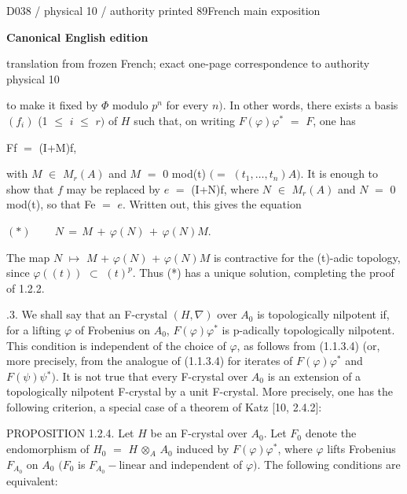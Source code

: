 \documentclass[9pt]{article}
\newcommand{\CanonText}[1]{\par{\fontsize{8.0}{9.35}\selectfont\RaggedRight #1\par}\vspace{2.2pt}}
\newcommand{\CanonDisplay}[1]{\par\vspace{1.2pt}\begin{center}{\fontsize{7.2}{8.4}\selectfont\(\displaystyle #1\)}\end{center}\vspace{1.2pt}}
\newcommand{\LayerTitle}{Canonical English edition}
\begin{document}
\noindent\begin{minipage}[t][\dimexpr\textheight-5pt\relax][t]{\textwidth}
{\sffamily\fontsize{7.3}{8.2}\selectfont\color{Quiet} D038 / physical 10 / authority printed 89\hfill French main exposition}
\par{}\vspace{4.5pt}
{\sffamily\fontsize{10.4}{11.6}\selectfont\bfseries\color{Accent} \LayerTitle}
\par{\sffamily\fontsize{6.7}{7.7}\selectfont\color{Quiet} translation from frozen French; exact one-page correspondence to authority physical 10}
\vspace{5pt}
\CanonText{to make it fixed by \(\Phi{}\) modulo \(p^{n}\) for every \(n)\). In other words, there exists a basis \((f_{i})\) (1 \(\leq{}\) \(i\) \(\leq{}\) \(r)\) of \(H\) such that, on writing \(F(\varphi{})\varphi{}^{*}\) \(=\) \(F\), one has}
\CanonText{Ff \(=\) (I+M)f,}
\CanonText{with \(M\) \(\in{}\) \(M_{r}(A)\) and \(M\) \(=\) 0 mod(t) \((=\) \((t_{1},\ldots{},t_{n})A)\). It is enough to show that \(f\) may be replaced by \(e\) \(=\) (I+N)f, where \(N\) \(\in{}\) \(M_{r}(A)\) and \(N\) \(=\) 0 mod(t), so that Fe \(=\) \(e\). Written out, this gives the equation}
\CanonDisplay{(*)\qquad\,N\,=\,M\,+\,\varphi{}(N)\,+\,\varphi{}(N)M.}
\CanonText{The map \(N\) \(\mapsto{}\) \(M\) + \(\varphi{}(N)\) + \(\varphi{}(N)M\) is contractive for the (t)-adic topology, since \(\varphi{}((t))\) \(\subset{}\) \((t)^{p}\). Thus (*) has a unique solution, completing the proof of 1.2.2.}
\CanonText{1.2.3. We shall say that an F-crystal \((H,\nabla{})\) over \(A_{0}\) is topologically nilpotent if, for a lifting \(\varphi{}\) of Frobenius on \(A_{0}\), \(F(\varphi{})\varphi{}^{*}\) is p-adically topologically nilpotent. This condition is independent of the choice of \(\varphi{}\), as follows from (1.1.3.4) (or, more precisely, from the analogue of (1.1.3.4) for iterates of \(F(\varphi{})\varphi{}^{*}\) and \(F(\psi{})\psi{}^{*})\). It is not true that every F-crystal over \(A_{0}\) is an extension of a topologically nilpotent F-crystal by a unit F-crystal. More precisely, one has the following criterion, a special case of a theorem of Katz [10, 2.4.2]:}
\CanonText{PROPOSITION 1.2.4. Let \(H\) be an F-crystal over \(A_{0}\). Let \(F_{0}\) denote the endomorphism of \(H_{0}\) \(=\) \(H\) \(\otimes{}_{A}\) \(A_{0}\) induced by \(F(\varphi{})\varphi{}^{*}\), where \(\varphi{}\) lifts Frobenius \(F_{A_{0}}\) on \(A_{0}\) \((F_{0}\) is \(F_{A_{0}}-\text{linear}\) and independent of \(\varphi{})\). The following conditions are equivalent:}

\end{minipage}
\end{document}

